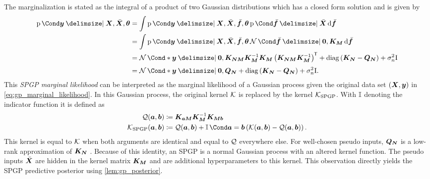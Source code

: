The marginalization is stated as the integral of a product of two Gaussian distributions which has a closed form solution and is given by
\begin{align}
    \begin{split}
        \Prob{\mat{y} \given \mat{X}, \ps{\mat{X}}, \mat{\theta}} &= \int \Prob{\mat{y} \given \mat{X}, \ps{\mat{X}}, \ps{\mat{f}}, \mat{\theta}} \Prob{\ps{\mat{f}} \given \ps{\mat{X}}} \diff \ps{\mat{f}} \\
        &= \int \Prob{\mat{y} \given \mat{X}, \ps{\mat{X}}, \ps{\mat{f}}, \mat{\theta}} \Gaussian{\ps{\mat{f}} \given \mat{0}, \mat{K_M}} \diff \ps{\mat{f}} \\
        &= \Gaussian*{\mat{y} \given \mat{0}, \mat{K_{NM}} \mat{K_M}^{-1} \mat{K_M} \left( \mat{K_{NM}} \mat{K_M}^{-1} \right)\tran + \diag\left( \mat{K_N} - \mat{Q_N} \right) + \sigma_n^2 \Eye} \\
        &= \Gaussian*{\vphantom{\left( \mat{K_M}^{-1} \right)\tran} \mat{y} \given \mat{0}, \mat{Q_N} + \diag\left( \mat{K_N} - \mat{Q_N} \right) + \sigma_n^2 \Eye}.
    \end{split}
\end{align}
This \emph{SPGP marginal likelihood} can be interpreted as the marginal likelihood of a Gaussian process given the original data set $(\bm{X}, \bm{y})$ in \cref{eq:gp_marginal_likelihood}.
In this Gaussian process, the original kernel $\operatorname{\mathcal{K}}$ is replaced by the kernel $\operatorname{\mathcal{K}}_{\text{SPGP}}$.
With $\operatorname{\mathbb{I}}$ denoting the indicator function it is defined as
\begin{align}
    \begin{split}
        \Q(\mat{a}, \mat{b}) &\coloneqq \mat{K_{aM}} \mat{K_M}^{-1} \mat{K_{Mb}} \\
        \K_{\text{SPGP}}(\mat{a}, \mat{b}) &\coloneqq \Q(\mat{a}, \mat{b}) + \Indicator{\mat{a} = \mat{b}} \left( \K(\mat{a}, \mat{b}) - \Q(\mat{a}, \mat{b}) \right).
    \end{split}
\end{align}
This kernel is equal to $\operatorname{\mathcal{K}}$ when both arguments are identical and equal to $\operatorname{\mathcal{Q}}$ everywhere else.
For well-chosen pseudo inputs, $\bm{Q_N}$ is a low-rank approximation of $\bm{K_N}$ \cite{snelson_flexible_2007}.
Because of this identity, an SPGP is a normal Gaussian process with an altered kernel function.
The pseudo inputs $\bar{\bm{X}}$ are hidden in the kernel matrix $\bm{K_M}$ and are additional hyperparameters to this kernel.
This observation directly yields the SPGP predictive posterior using \cref{lem:gp_posterior}.
